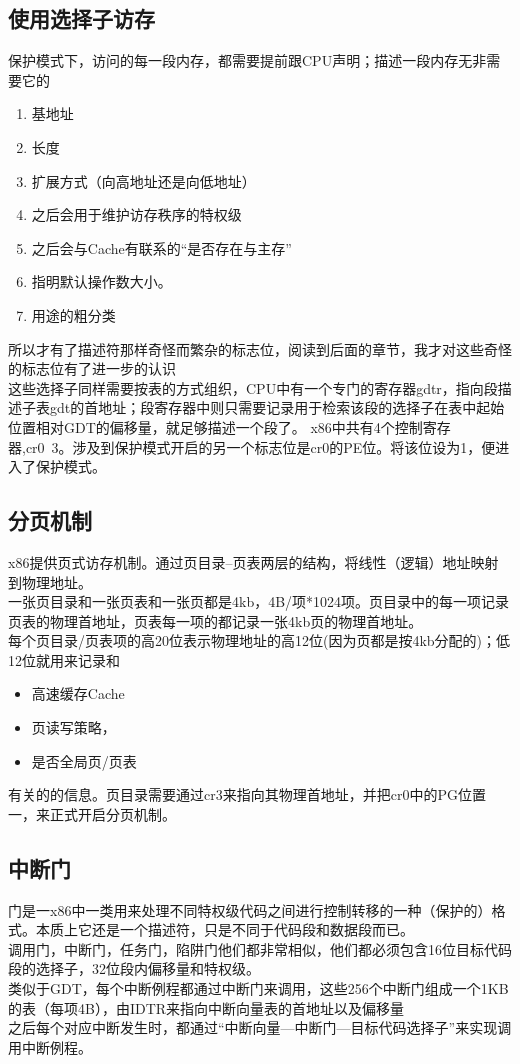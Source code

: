 \documentclass[a4paper,11pt,UTF8]{ctexart}
\begin{document}
	\subsection{使用选择子访存}
	保护模式下，访问的每一段内存，都需要提前跟CPU声明；描述一段内存无非需要它的
	\begin{enumerate}
		\item 基地址
		\item 长度
		\item 扩展方式（向高地址还是向低地址）
		\item 之后会用于维护访存秩序的特权级
		\item 之后会与Cache有联系的“是否存在与主存”
		\item 指明默认操作数大小。
		\item 用途的粗分类
	\end{enumerate}
	\indent 所以才有了描述符那样奇怪而繁杂的标志位，阅读到后面的章节，我才对这些奇怪的标志位有了进一步的认识\\
	\indent 这些选择子同样需要按表的方式组织，CPU中有一个专门的寄存器gdtr，指向段描述子表gdt的首地址；段寄存器中则只需要记录用于检索该段的选择子在表中起始位置相对GDT的偏移量，就足够描述一个段了。
	\indent x86中共有4个控制寄存器,cr0~3。涉及到保护模式开启的另一个标志位是cr0的PE位。将该位设为1，便进入了保护模式。
	\subsection{分页机制}
	x86提供页式访存机制。通过页目录--页表两层的结构，将线性（逻辑）地址映射到物理地址。\\
	\indent 一张页目录和一张页表和一张页都是4kb，4B/项*1024项。页目录中的每一项记录页表的物理首地址，页表每一项的都记录一张4kb页的物理首地址。\\
	\indent 每个页目录/页表项的高20位表示物理地址的高12位(因为页都是按4kb分配的)；低12位就用来记录和
	\begin{itemize}
		\item 高速缓存Cache
		\item 页读写策略，
		\item 是否全局页/页表
	\end{itemize}
	有关的的信息。页目录需要通过cr3来指向其物理首地址，并把cr0中的PG位置一，来正式开启分页机制。
	\subsection{中断门}
	门是一x86中一类用来处理不同特权级代码之间进行控制转移的一种（保护的）格式。本质上它还是一个描述符，只是不同于代码段和数据段而已。\\
	\indent 调用门，中断门，任务门，陷阱门他们都非常相似，他们都必须包含16位目标代码段的选择子，32位段内偏移量和特权级。\\
	\indent 类似于GDT，每个中断例程都通过中断门来调用，这些256个中断门组成一个1KB的表（每项4B），由IDTR来指向中断向量表的首地址以及偏移量\\
	\indent 之后每个对应中断发生时，都通过“中断向量---中断门---目标代码选择子”来实现调用中断例程。
	
\end{document}

